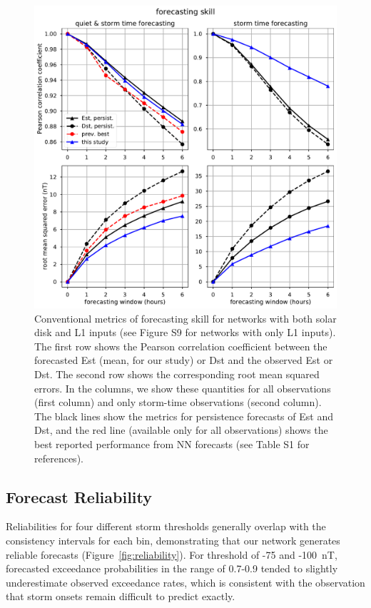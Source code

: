 \begin{figure}[htbp]
  \centering
  \includegraphics[width=1.0\textwidth]{figures/skill_comparison.pdf} 
  \caption{Conventional metrics of forecasting skill for networks with both solar disk and L1 inputs (see Figure S9 for networks with only L1 inputs). The first row shows the Pearson correlation coefficient between the forecasted Est (mean, for our study) or Dst and the observed Est or Dst. The second row shows the corresponding root mean squared errors. In the columns, we show these quantities for all observations (first column) and only storm-time observations (second column). The black lines show the metrics for persistence forecasts of Est and Dst, and the red line (available only for all observations) shows the best reported performance from NN forecasts (see Table S1 for references).}
  \label{fig:skill}
\end{figure}


\subsection{Forecast Reliability}

Reliabilities for four different storm thresholds generally overlap with the consistency intervals for each bin, demonstrating that our network generates reliable forecasts (Figure~\ref{fig:reliability}). For threshold of -75 and -100~nT, forecasted exceedance probabilities in the range of 0.7-0.9 tended to slightly underestimate observed exceedance rates, which is consistent with the observation that storm onsets remain difficult to predict exactly.


